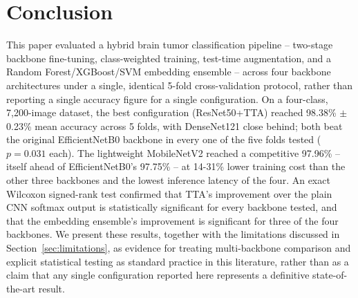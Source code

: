 \documentclass[11pt]{article}
\begin{document}
\section{Conclusion}
\label{sec:conclusion}
This paper evaluated a hybrid brain tumor classification pipeline -- two-stage backbone fine-tuning, class-weighted training, test-time augmentation, and a Random Forest/XGBoost/SVM embedding ensemble -- across four backbone architectures under a single, identical 5-fold cross-validation protocol, rather than reporting a single accuracy figure for a single configuration. On a four-class, 7,200-image dataset, the best configuration (ResNet50+TTA) reached 98.38\% $\pm$ 0.23\% mean accuracy across 5 folds, with DenseNet121 close behind; both beat the original EfficientNetB0 backbone in every one of the five folds tested ($p=0.031$ each). The lightweight MobileNetV2 reached a competitive 97.96\% -- itself ahead of EfficientNetB0's 97.75\% -- at 14-31\% lower training cost than the other three backbones and the lowest inference latency of the four. An exact Wilcoxon signed-rank test confirmed that TTA's improvement over the plain CNN softmax output is statistically significant for every backbone tested, and that the embedding ensemble's improvement is significant for three of the four backbones. We present these results, together with the limitations discussed in Section~\ref{sec:limitations}, as evidence for treating multi-backbone comparison and explicit statistical testing as standard practice in this literature, rather than as a claim that any single configuration reported here represents a definitive state-of-the-art result.
\end{document}

